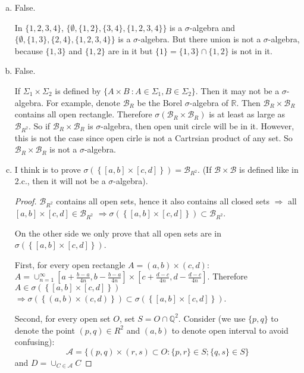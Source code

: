 \documentclass[11pt]{article}
\begin{document}
\begin{enumerate}[1.]
\begin{enumerate}[(a)]
        \item
        False.

        In $\{1,2,3,4\}$, $\{\emptyset, \{1,2\}, \{3,4\}, \{1,2,3,4\}\}$ is a $\sigma$-algebra and $\{\emptyset, \{1,3\}, \{2,4\}, \{1,2,3,4\}\}$ is a $\sigma$-algebra.
        But there union is not a $\sigma$-algebra, because $\{1,3\}$ and $\{1,2\}$ are in it but $\{1\} = \{1,3\} \cap \{1,2\}$ is not in it.
        
        \item
        False.

        If $\Sigma_1 \times \Sigma_2$ is defined by $\{A \times B \ : A \in \Sigma_1, B \in \Sigma_2\}$. Then it may not be a $\sigma$-algebra.
        For example, denote $\mathcal{B}_R$ be the Borel $\sigma$-algebra of $\mathbb{R}$. Then $\mathcal{B}_R \times \mathcal{B}_R$ contains all open rectangle. Therefore $\sigma(\mathcal{B}_R \times \mathcal{B}_R)$ is at least as large as $\mathcal{B}_{R^2}$.
        So if $\mathcal{B}_R \times \mathcal{B}_R$ is $\sigma$-algebra, then open unit circle will be in it. However, this is not the case since open cirle is not a Cartrsian product of any set. So $\mathcal{B}_R \times \mathcal{B}_R$ is not a $\sigma$-algebra.

        \item
        I think is to prove $\sigma(\left\{[a,b] \times [c,d]\right\}) = \mathcal{B}_{R^2}$. (If $\mathcal{B} \times \mathcal{B}$ is defined like in 2.c., then it will not be a $\sigma$-algebra).
        \begin{proof}
            $\mathcal{B}_{R^2}$ contains all open sets, hence it also contains all closed sets $\Rightarrow$ all $[a,b] \times [c,d] \in \mathcal{B}_{R^2} $ $\Rightarrow \sigma(\left\{[a,b] \times [c,d]\right\}) \subset \mathcal{B}_{R^2}$.
            
            On the other side we only prove that all open sets are in $\sigma(\left\{[a,b] \times [c,d]\right\})$.
            
            First, for every open rectangle $A = (a,b) \times (c,d)$: $A = \cup_{n=1}^\infty [a+\frac{b-a}{4n}, b-\frac{b-a}{4n}] \times [c+\frac{d-c}{4n}, d-\frac{d-c}{4n}]$.
            Therefore $A \in \sigma(\left\{[a,b] \times [c,d]\right\})$ $\Rightarrow \sigma(\left\{(a,b) \times (c,d)\right\}) \subset \sigma(\left\{[a,b] \times [c,d]\right\})$.

            Second, for every open set $O$, set $S = O \cap \mathbb{Q}^2$. Consider (we use $\{p,q\}$ to denote the point $(p,q) \in R^2$ and $(a,b)$ to denote open interval to avoid confusing):
            $$\mathcal{A} = \{(p,q) \times (r,s) \subset O : \{p,r\} \in S; \{q,s\} \in S\}$$
            and $D = \cup_{C \in \mathcal{A}} C$
            

\end{proof}
\end{enumerate}
\end{enumerate}
\end{document}
